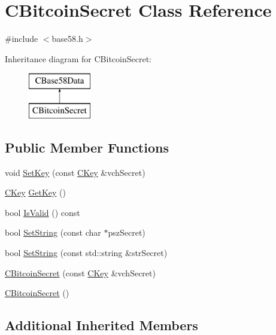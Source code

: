 \hypertarget{class_c_bitcoin_secret}{}\section{C\+Bitcoin\+Secret Class Reference}
\label{class_c_bitcoin_secret}


{\ttfamily \#include $<$base58.\+h$>$}

Inheritance diagram for C\+Bitcoin\+Secret\+:\begin{figure}[H]
\begin{center}
\leavevmode
\includegraphics[height=2.000000cm]{class_c_bitcoin_secret}
\end{center}
\end{figure}
\subsection*{Public Member Functions}
\begin{DoxyCompactItemize}
\item 
void \hyperlink{class_c_bitcoin_secret_a3629c0fce320664c3c07cb082939d6ec}{Set\+Key} (const \hyperlink{class_c_key}{C\+Key} \&vch\+Secret)
\item 
\hyperlink{class_c_key}{C\+Key} \hyperlink{class_c_bitcoin_secret_a4d6bf559d092e6d47f8001c7171096df}{Get\+Key} ()
\item 
bool \hyperlink{class_c_bitcoin_secret_a4662c854955af56c047d0e9052096fba}{Is\+Valid} () const 
\item 
bool \hyperlink{class_c_bitcoin_secret_a6a8aff02f66099f33f573ad3e6375bb1}{Set\+String} (const char $\ast$psz\+Secret)
\item 
bool \hyperlink{class_c_bitcoin_secret_a83cfc3b34aac494efdd6e316cd08626d}{Set\+String} (const std\+::string \&str\+Secret)
\item 
\hyperlink{class_c_bitcoin_secret_a0358baa459a1f22661b601d9d83eacf8}{C\+Bitcoin\+Secret} (const \hyperlink{class_c_key}{C\+Key} \&vch\+Secret)
\item 
\hyperlink{class_c_bitcoin_secret_a3b6168eef2ab8c44d60272e62162fd5b}{C\+Bitcoin\+Secret} ()
\end{DoxyCompactItemize}
\subsection*{Additional Inherited Members}


